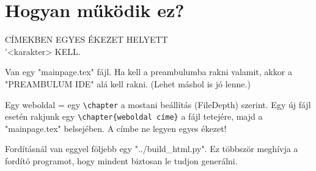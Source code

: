 \chapter{Hogyan működik ez?}

{\LARGE CÍMEKBEN EGYES ÉKEZET HELYETT \\'<karakter> KELL.}

Van egy "mainpage.tex" fájl. Ha kell a preambulumba rakni valamit, akkor a "PREAMBULUM IDE" alá kell rakni. (Lehet máshol is jó lenne.)

Egy weboldal = egy \verb*|\chapter| a mostani beállítás (FileDepth) szerint. Egy új fájl esetén rakjunk egy \verb|\chapter{weboldal címe}|  a fájl tetejére, majd \verb|| a "mainpage.tex" belsejében. A címbe ne legyen egyes ékezet!

Fordításnál van eggyel följebb egy "../build\_html.py". Ez többször meghívja a fordító programot, hogy mindent biztosan le tudjon generálni.

